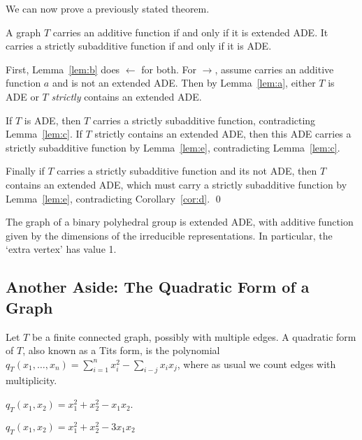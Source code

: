 We can now prove a previously stated theorem.

\begin{thm}
A graph $T$ carries an additive function if and only if it is extended ADE. It carries a strictly subadditive function if and only if it is ADE. 
\end{thm}

\pf First, Lemma~\ref{lem:b} does $\leftarrow$ for both. For $\to$, assume carries an additive function $a$ and is not an extended ADE. Then by Lemma~\ref{lem:a}, either $T$ is ADE or $T$ \emph{strictly} contains an extended ADE. 

If $T$ is ADE, then $T$ carries a strictly subadditive function, contradicting Lemma~\ref{lem:c}. If $T$ strictly contains an extended ADE, then this ADE carries a strictly subadditive function by Lemma~\ref{lem:e}, contradicting Lemma~\ref{lem:c}. 

Finally if $T$ carries a strictly subadditive function and its not ADE, then $T$ contains an extended ADE, which must carry a strictly subadditive function by Lemma~\ref{lem:e}, contradicting Corollary~\ref{cor:d}. \qed \\


\begin{cor} \label{cor:point}
The \mc graph of a binary polyhedral group is extended ADE, with additive function given by the dimensions of the irreducible representations. In particular, the `extra vertex' has value 1. 
\end{cor}






\subsection{Another Aside: The Quadratic Form of a Graph}

\begin{dfn}
Let $T$ be a finite connected graph, possibly with multiple edges. A quadratic form of $T$, also known as a Tits form, is the polynomial $q_T(x_1,\ldots,x_n)= \sum_{i=1}^n x_i^2 - \sum_{i-j} x_ix_j$, where as usual we count edges with multiplicity. 
\end{dfn}


\begin{ex}
$q_T(x_1,x_2)= x_1^2+x_2^2-x_1x_2$.

$q_T(x_1,x_2)= x_1^2+x_2^2-3x_1x_2$
\end{ex}

